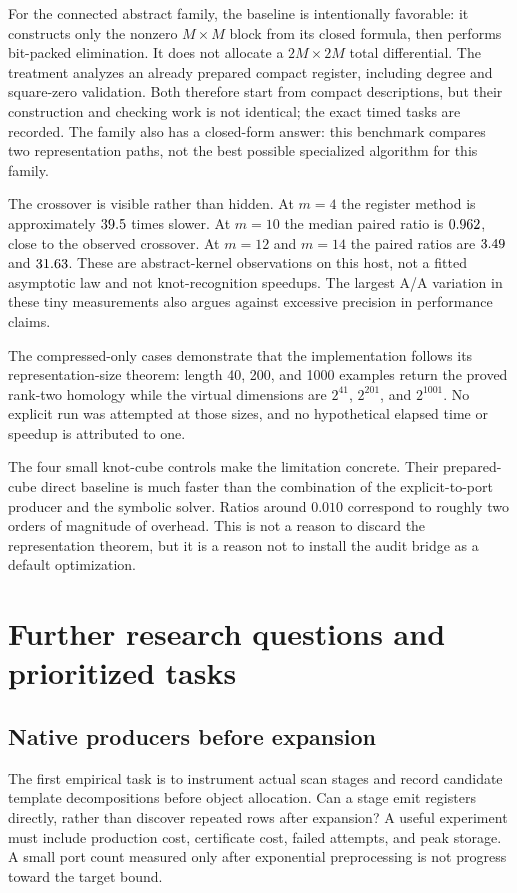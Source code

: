 \documentclass[11pt,letterpaper]{article}
\theoremstyle{definition}
\theoremstyle{remark}
\numberwithin{equation}{section}
\begin{document}
For the connected abstract family, the baseline is intentionally favorable:
it constructs only the nonzero $M\times M$ block from its closed formula,
then performs bit-packed elimination. It does not allocate a
$2M\times2M$ total differential. The treatment analyzes an already
prepared compact register, including degree and square-zero validation.
Both therefore start from compact descriptions, but their construction
and checking work is not identical; the exact timed tasks are recorded.
The family also has a closed-form answer: this benchmark compares two
representation paths, not the best possible specialized algorithm for
this family.



The crossover is visible rather than hidden. At $m=4$ the register method
is approximately $39.5$ times slower. At $m=10$ the median paired
ratio is $0.962$, close to the observed crossover. At $m=12$ and
$m=14$ the paired ratios are $3.49$ and $31.63$. These
are abstract-kernel observations on this host, not a fitted asymptotic
law and not knot-recognition speedups. The largest A/A variation in
these tiny measurements also argues against excessive precision in
performance claims.

The compressed-only cases demonstrate that the implementation follows its
representation-size theorem: length 40, 200, and 1000 examples return the
proved rank-two homology while the virtual dimensions are $2^{41}$,
$2^{201}$, and $2^{1001}$. No explicit run was attempted at those sizes,
and no hypothetical elapsed time or speedup is attributed to one.

The four small knot-cube controls make the limitation concrete. Their
prepared-cube direct baseline is much faster than the combination of the
explicit-to-port producer and the symbolic solver. Ratios around
$0.010$ correspond to roughly two orders of magnitude of overhead.
This is not a reason to discard the representation theorem, but it is a
reason not to install the audit bridge as a default optimization.

\section{Further research questions and prioritized tasks}
\label{sec:research}

\subsection{Native producers before expansion}
The first empirical task is to instrument actual scan stages and record
candidate template decompositions before object allocation. Can a stage
emit registers directly, rather than discover repeated rows after
expansion? A useful experiment must include production cost, certificate
cost, failed attempts, and peak storage. A small port count measured only
after exponential preprocessing is not progress toward the target bound.
\end{document}
